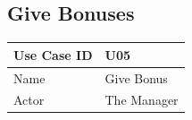 \documentclass[12pt]{article}
\begin{document}
\subsection{Give Bonuses}

\begin{table}[H]
\begin{tabular}{|l|l|}
\hline
Use Case ID & U05                                                                                                                                                                                                                                                                                                                                                                                                                                                                                                                                                                                                                                                                                                                                                                                                                           \\ \hline
Name        & Give Bonus                                                                                                                                                                                                                                                                                                                                                                                                                                                                                                                                                                                                                                                                                                                                                                                                                    \\ \hline
Actor       & The Manager                                                                                                                                                                                                                                                                                                                                                                                                                                                                                                                                                                                                                                                                                                                                                                                                                   \\ \hline

\end{tabular}
\end{table}
\end{document}
